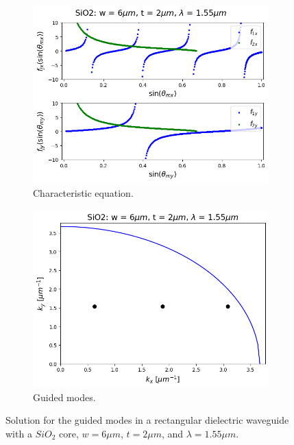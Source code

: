 \documentclass[a4paper,12pt]{article}
\begin{document}
\begin{figure}[H]
    \centering
    \begin{subfigure}{0.45\textwidth}
        \centering
        \includegraphics[scale=0.45]{modes_SiO2_w6um_t2um_wv1.55um.png}
        \caption{Characteristic equation.}
        \label{fig:char_eq2}
    \end{subfigure}
    \hfill
    \begin{subfigure}{0.45\textwidth}
        \centering
        \includegraphics[scale=0.45]{modeshell_SiO2_w6um_t2um_wv1.55um.png}
        \caption{Guided modes.}
        \label{fig:shell_modes2}
    \end{subfigure}
    \caption{Solution for the guided modes in a rectangular dielectric waveguide with a $SiO_2$ core, $w = 6 \mu m$, $t = 2\mu m$, and $\lambda = 1.55 \mu m$.}
\end{figure}
\end{document}
